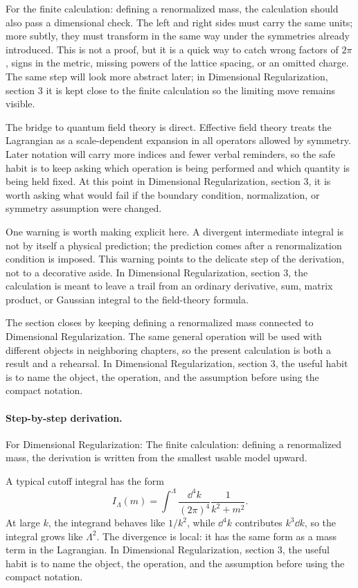 For the finite calculation: defining a renormalized mass, the calculation should also pass a dimensional check.  The left and right sides must carry the same units; more subtly, they must transform in the same way under the symmetries already introduced.  This is not a proof, but it is a quick way to catch wrong factors of \(2\pi\), signs in the metric, missing powers of the lattice spacing, or an omitted charge.  The same step will look more abstract later; in Dimensional Regularization, section 3 it is kept close to the finite calculation so the limiting move remains visible.

The bridge to quantum field theory is direct.  Effective field theory treats the Lagrangian as a scale-dependent expansion in all operators allowed by symmetry.  Later notation will carry more indices and fewer verbal reminders, so the safe habit is to keep asking which operation is being performed and which quantity is being held fixed.  At this point in Dimensional Regularization, section 3, it is worth asking what would fail if the boundary condition, normalization, or symmetry assumption were changed.

One warning is worth making explicit here.  A divergent intermediate integral is not by itself a physical prediction; the prediction comes after a renormalization condition is imposed.  This warning points to the delicate step of the derivation, not to a decorative aside.  In Dimensional Regularization, section 3, the calculation is meant to leave a trail from an ordinary derivative, sum, matrix product, or Gaussian integral to the field-theory formula.

The section closes by keeping defining a renormalized mass connected to Dimensional Regularization.  The same general operation will be used with different objects in neighboring chapters, so the present calculation is both a result and a rehearsal.  In Dimensional Regularization, section 3, the useful habit is to name the object, the operation, and the assumption before using the compact notation.



\paragraph{Step-by-step derivation.}

For Dimensional Regularization: The finite calculation: defining a renormalized mass, the derivation is written from the smallest usable model upward.

A typical cutoff integral has the form
\[
  I_\Lambda(m)=\int^{\Lambda}\frac{\dd^4k}{(2\pi)^4}\frac{1}{k^2+m^2}.
\]
At large \(k\), the integrand behaves like \(1/k^2\), while \(\dd^4k\) contributes \(k^3\dd k\), so the integral grows like \(\Lambda^2\).  The divergence is local: it has the same form as a mass term in the Lagrangian.  In Dimensional Regularization, section 3, the useful habit is to name the object, the operation, and the assumption before using the compact notation.

